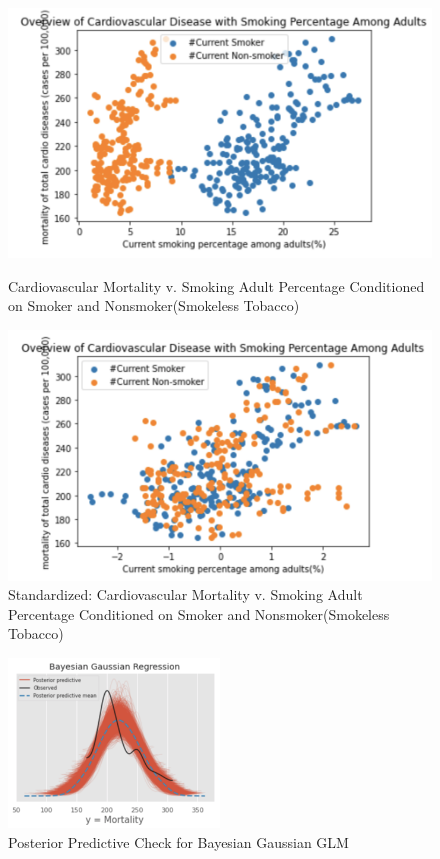 \documentclass{article}
\begin{document}
\begin{figure}
\centering
\begin{minipage}{0.5\textwidth}
  \centering
  \includegraphics[width=1\linewidth]{scatter1.png}
  \caption{Cardiovascular Mortality v. Smoking Adult Percentage Conditioned on Smoker and Nonsmoker(Smokeless Tobacco)}
  \label{fig:figure10}
  
\end{minipage}%
\begin{minipage}{0.5\textwidth}
  \centering
  \includegraphics[width=1\linewidth]{scatter2.png}
  \caption{Standardized: Cardiovascular Mortality v. Smoking Adult Percentage Conditioned on Smoker and Nonsmoker(Smokeless Tobacco)}
  \label{fig:figure11}
\end{minipage}
\end{figure}

\begin{figure}
\centering
\includegraphics[width=0.5\textwidth]{gaussian_ppc.png}
\caption{Posterior Predictive Check for Bayesian Gaussian GLM}
\label{fig:figure12}
\end{figure}
\end{document}

